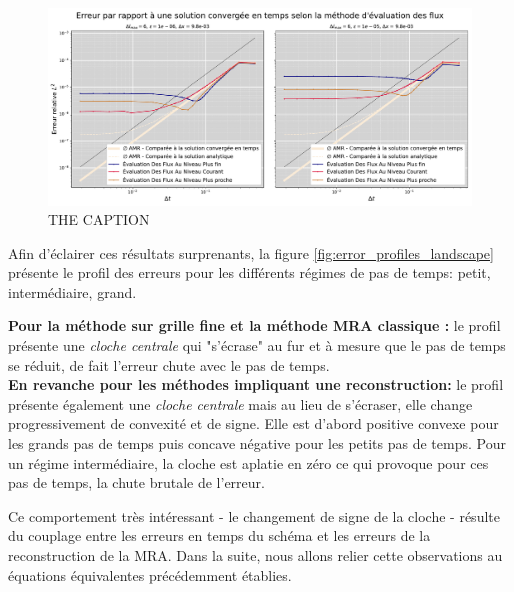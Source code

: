 \begin{figure}[h!]
    \centering
    \includegraphics[width=\textwidth]{media/4_travail/3/flux_reconstruction_method_diffusion.pdf}
    \caption{THE CAPTION}
    \label{fig:convergence_diffusion_rok4}
\end{figure}
    Afin d'éclairer ces résultats surprenants, la figure \ref{fig:error_profiles_landscape} présente le profil des erreurs pour les différents régimes de pas de temps: petit, intermédiaire, grand.\par
    \textbf{Pour la méthode sur grille fine et la méthode MRA classique :} le profil présente une \textit{cloche centrale} qui "s'écrase" au fur et à mesure que le pas de temps se réduit, de fait l'erreur chute avec le pas de temps.\\
    \textbf{En revanche pour les méthodes impliquant une reconstruction:} le profil présente également une \textit{cloche centrale} mais au lieu de s'écraser,
    elle change progressivement de convexité et de signe.
    Elle est d'abord positive convexe pour les grands pas de temps puis concave négative pour les petits pas de temps.
    Pour un régime intermédiaire, la cloche est aplatie en zéro ce qui provoque pour ces pas de temps, la chute brutale de l'erreur.\par
    Ce comportement très intéressant - le changement de signe de la cloche - résulte du couplage entre les erreurs en temps du schéma et les erreurs de la reconstruction de la MRA. 
    Dans la suite, nous allons relier cette observations au équations équivalentes précédemment établies.
\clearpage

